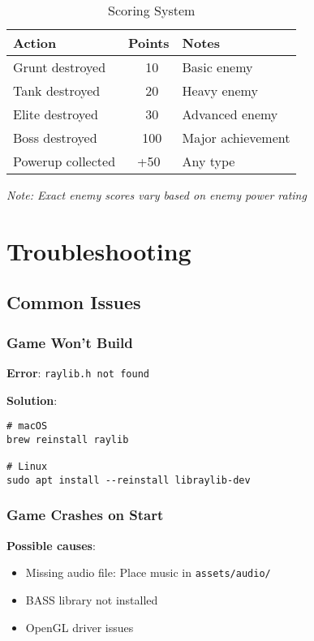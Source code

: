 \documentclass[11pt,a4paper]{article}
\begin{document}
\begin{table}[h]
\centering
\begin{tabularx}{\textwidth}{|l|c|X|}
\hline
\rowcolor{primarycolor!20}
\textbf{Action} & \textbf{Points} & \textbf{Notes} \\
\hline
Grunt destroyed & ~10 & Basic enemy \\
\hline
Tank destroyed & ~20 & Heavy enemy \\
\hline
Elite destroyed & ~30 & Advanced enemy \\
\hline
Boss destroyed & ~100 & Major achievement \\
\hline
Powerup collected & +50 & Any type \\
\hline
\end{tabularx}
\caption{Scoring System}
\end{table}

\textit{Note: Exact enemy scores vary based on enemy power rating}

\section{Troubleshooting}

\subsection{Common Issues}

\subsubsection{Game Won't Build}

\textbf{Error}: \texttt{raylib.h not found}

\textbf{Solution}:
\begin{verbatim}
# macOS
brew reinstall raylib

# Linux
sudo apt install --reinstall libraylib-dev
\end{verbatim}

\subsubsection{Game Crashes on Start}

\textbf{Possible causes}:
\begin{itemize}[nosep]
    \item Missing audio file: Place music in \texttt{assets/audio/}
    \item BASS library not installed
    \item OpenGL driver issues
\end{itemize}
\end{document}
